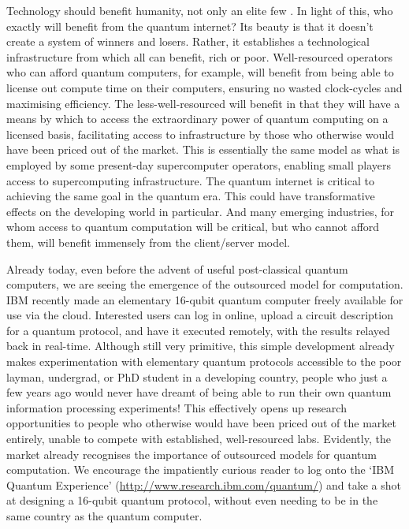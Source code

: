 Technology should benefit humanity, not only an elite few . In light of this, who exactly will benefit from the quantum internet? Its beauty is that it doesn't create a system of winners and losers. Rather, it establishes a technological infrastructure from which all can benefit, rich or poor. Well-resourced operators who can afford quantum computers, for example, will benefit from being able to license out compute time on their computers, ensuring no wasted clock-cycles and maximising efficiency. The less-well-resourced will benefit in that they will have a means by which to access the extraordinary power of quantum computing on a licensed basis, facilitating access to infrastructure by those who otherwise would have been priced out of the market. This is essentially the same model as what is employed by some present-day supercomputer operators, enabling small players access to supercomputing infrastructure. The quantum internet is critical to achieving the same goal in the quantum era. This could have transformative effects on the developing world in particular. And many emerging industries, for whom access to quantum computation will be critical, but who cannot afford them, will benefit immensely from the client/server model.

Already today, even before the advent of useful post-classical quantum computers, we are seeing the emergence of the outsourced model for computation. IBM recently made an elementary 16-qubit quantum computer freely available for use via the cloud. Interested users can log in online, upload a circuit description for a quantum protocol, and have it executed remotely, with the results relayed back in real-time. Although still very primitive, this simple development already makes experimentation with elementary quantum protocols accessible to the poor layman, undergrad, or PhD student in a developing country, people who just a few years ago would never have dreamt of being able to run their own quantum information processing experiments! This effectively opens up research opportunities to people who otherwise would have been priced out of the market entirely, unable to compete with established, well-resourced labs. Evidently, the market already recognises the importance of outsourced models for quantum computation. We encourage the impatiently curious reader to log onto the `IBM Quantum Experience' (\href{http://www.research.ibm.com/quantum/}{http://www.research.ibm.com/quantum/}) and take a shot at designing a 16-qubit quantum protocol, without even needing to be in the same country as the quantum computer.

